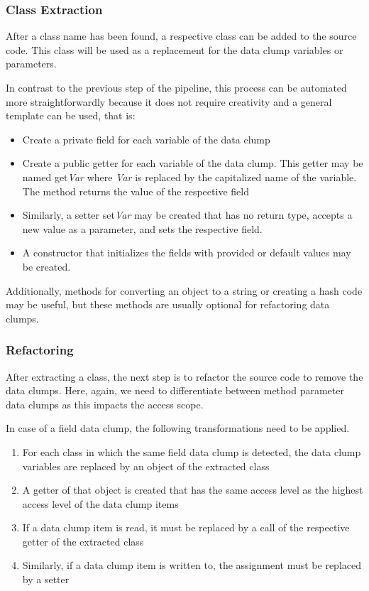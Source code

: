 \subsubsection{Class Extraction}\label{subsec:chap3_data_class_extraction}
After a class name has been found, a respective class can be added to the source code. This class will be used as a replacement for the data clump variables or parameters. 

In contrast to the previous step of the pipeline, this process can be automated more straightforwardly because it does not require creativity and a general template can be used, that is:
\begin{itemize}
    \item Create a private field for each variable of the data clump
    \item Create a public getter for each variable of the data clump. This getter may be named get\textit{Var} where \textit{Var} is replaced by the capitalized name of the variable. The method returns the value of the respective field
    \item Similarly, a setter set\textit{Var} may be created that has no return type, accepts a new value as a parameter, and sets the respective field. 
    \item A constructor that initializes the fields with provided or default values may be created. 
\end{itemize}

Additionally, methods for converting an object to a string or creating a hash code may be useful, but these methods are usually optional for refactoring data clumps. 


\subsubsection{Refactoring}
After extracting a class, the next step is to refactor the source code to remove the data clumps. Here, again, we need to differentiate between method parameter data clumps as this impacts the access scope. 

In case of a field data clump, the following transformations need to be applied.

\begin{enumerate}
    \item For each class in which the same field data clump is detected, the data clump variables are replaced by an object of the extracted class
    \item A getter of that object is created that has the same access level as the highest access level of the data clump items
    \item If a data clump item is read, it must be replaced by a call of the respective getter of the extracted class
    \item Similarly, if a data clump item is written to, the assignment must be replaced by a setter
\end{enumerate}



